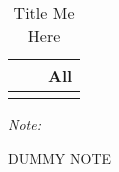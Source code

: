 \begin{table}[htbp]
\caption{Title Me Here}
\begin{center}%
\small\begin{tabular}{l c c}
 &  & All
\\
\hline\hline\noalign{\smallskip} 
\hline\hline\noalign{\smallskip} \end{tabular} 
\begin{minipage}{6in}
{\it Note:} \begin{center}DUMMY NOTE
\end{center}
\end{minipage}
\end{center}
\end{table}
